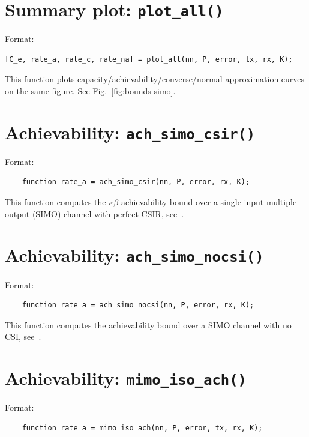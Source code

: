 \documentclass[a4paper,11p]{memoir}
\begin{document}
%
%
\section{Summary plot: \texttt{plot\_all()}}

Format:
\begin{verbatim}
[C_e, rate_a, rate_c, rate_na] = plot_all(nn, P, error, tx, rx, K);
\end{verbatim}

This function plots capacity/achievability/converse/normal approximation curves on the same figure. See Fig.~\ref{fig:bounds-simo}.


\section{Achievability: \texttt{ach\_simo\_csir()}}

Format:
\begin{verbatim}
	function rate_a = ach_simo_csir(nn, P, error, rx, K);
\end{verbatim}

This function computes the $\kappa\beta$ achievability bound over a single-input multiple-output (SIMO) channel with perfect CSIR, see~\cite[Footnote~7]{yang14-07a}.

\section{Achievability: \texttt{ach\_simo\_nocsi()} }
Format:
\begin{verbatim}
	function rate_a = ach_simo_nocsi(nn, P, error, rx, K);
\end{verbatim}

This function computes the achievability bound over a SIMO channel with no CSI, see~\cite[Eq.~(67)]{yang14-07a}. 

\section{Achievability: \texttt{mimo\_iso\_ach()}}
Format:
\begin{verbatim}
	function rate_a = mimo_iso_ach(nn, P, error, tx, rx, K);
\end{verbatim}
\end{document}
